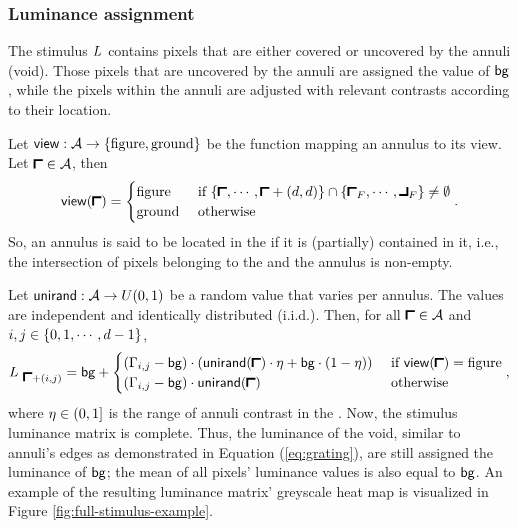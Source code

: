 \subsubsection{Luminance assignment}
\label{sec:luminance-assignment}

The stimulus $L$ contains pixels that are either covered or uncovered by the annuli (void). Those pixels that are uncovered by the annuli are assigned the value of $\mathsf{bg}$, while the pixels within the annuli are adjusted with relevant contrasts according to their location.

Let $\mathsf{view}: \mathcal{A} \to \{ \mathrm{figure}, \mathrm{ground} \}$ be the function mapping an annulus to its view. Let $\annstart \in \annuliset$, then
\begin{equation}
    \view(\annstart) = 
    \begin{cases}
        \fig & \text{ if } 
        \{ 
        \annstart, 
        \cdots,
        \annstart + (\diam, \diam)
        \}
        \cap
        \{ \figstart, \cdots, \figfinish \}
        \neq \emptyset \\
        \ground & \text{ otherwise} 
    \end{cases}.
\end{equation}
So, an annulus is said to be located in the \stimfig{} if it is (partially) contained in it, i.e., the intersection of pixels belonging to the \stimfig{} and the annulus is non-empty.

Let $\mathsf{unirand}: \mathcal{A} \to U(0, 1)$ be a random value that varies per annulus. The values are independent and identically distributed (i.i.d.). Then, for all $\annstart \in \annuliset$ and $i, j \in \{ 0, 1, \cdots, d - 1\}$,
\begin{equation}
    \fullmatrix_{\ \annstart + (i, j)} = \vlum +
    \begin{cases}
        (\annmatrix_{i, j} - \vlum) \cdot \left( \unirand(\annstart) \cdot \contrange + \vlum \cdot (1 - \contrange) \right) 
        &\text{ if } \view(\annstart) = \fig  \\
         (\annmatrix_{i, j} - \vlum) \cdot \unirand(\annstart) 
        &\text{ otherwise}
    \end{cases},
\end{equation}
where $\eta \in (0, 1]$ is the range of annuli contrast in the \stimfig.
Now, the stimulus luminance matrix is complete.
Thus, the luminance of the void, similar to annuli's edges as demonstrated in Equation (\ref{eq:grating}), are still assigned the luminance of $\mathsf{bg}$; the mean of all pixels' luminance values is also equal to $\mathsf{bg}$. An example of the resulting luminance matrix' greyscale heat map is visualized in Figure \ref{fig:full-stimulus-example}.